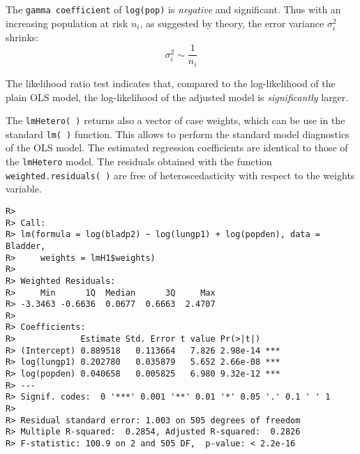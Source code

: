 \documentclass[
]{article}
\newenvironment{Shaded}{\begin{snugshade}}{\end{snugshade}}
\newcommand{\CommentTok}[1]{\textcolor[rgb]{0.56,0.35,0.01}{\textit{#1}}}
\newcommand{\DataTypeTok}[1]{\textcolor[rgb]{0.13,0.29,0.53}{#1}}
\newcommand{\ErrorTok}[1]{\textcolor[rgb]{0.64,0.00,0.00}{\textbf{#1}}}
\newcommand{\KeywordTok}[1]{\textcolor[rgb]{0.13,0.29,0.53}{\textbf{#1}}}
\newcommand{\NormalTok}[1]{#1}
\newcommand{\OperatorTok}[1]{\textcolor[rgb]{0.81,0.36,0.00}{\textbf{#1}}}
\newcommand{\StringTok}[1]{\textcolor[rgb]{0.31,0.60,0.02}{#1}}
\begin{document}
The \texttt{gamma\ coefficient} of \texttt{log(pop)} is \emph{negative}
and significant. Thus with an increasing population at risk \(n_i\), as
suggested by theory, the error variance \(\sigma_i^2\) shrinks: \[
\sigma_i^2 \sim \frac{1}{n_i}
\]

The likelihood ratio test indicates that, compared to the log-likelihood
of the plain OLS model, the log-likelihood of the adjusted model is
\emph{significantly} larger.

The \texttt{lmHetero(\ )} returns also a vector of case weights, which
can be use in the standard \texttt{lm(\ )} function. This allows to
perform the standard model diagnostics of the OLS model. The estimated
regression coefficients are identical to those of the \texttt{lmHetero}
model. The residuals obtained with the function
\texttt{weighted.residuals(\ )} are free of heteroscedasticity with
respect to the weights variable.

\begin{Shaded}
\end{Shaded}

\begin{verbatim}
R> 
R> Call:
R> lm(formula = log(bladp2) ~ log(lungp1) + log(popden), data = Bladder, 
R>     weights = lmH1$weights)
R> 
R> Weighted Residuals:
R>     Min      1Q  Median      3Q     Max 
R> -3.3463 -0.6636  0.0677  0.6663  2.4707 
R> 
R> Coefficients:
R>             Estimate Std. Error t value Pr(>|t|)    
R> (Intercept) 0.889518   0.113664   7.826 2.98e-14 ***
R> log(lungp1) 0.202780   0.035879   5.652 2.66e-08 ***
R> log(popden) 0.040658   0.005825   6.980 9.32e-12 ***
R> ---
R> Signif. codes:  0 '***' 0.001 '**' 0.01 '*' 0.05 '.' 0.1 ' ' 1
R> 
R> Residual standard error: 1.003 on 505 degrees of freedom
R> Multiple R-squared:  0.2854, Adjusted R-squared:  0.2826 
R> F-statistic: 100.9 on 2 and 505 DF,  p-value: < 2.2e-16
\end{verbatim}
\end{document}
